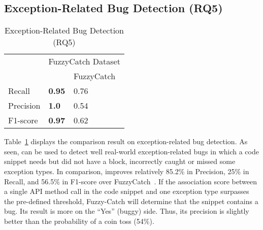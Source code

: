 \subsection{Exception-Related Bug Detection (RQ5)}
\label{sec:rq1}

\begin{table}[htpb]
  \caption {Exception-Related Bug Detection (RQ5)}
  \vspace{-12pt}
  \small
	\begin{center}
		\renewcommand{\arraystretch}{1}
		\begin{tabular}{|p{1.75cm}<{\centering}|p{1.75cm}<{\centering}|p{1.75cm}<{\centering}|}
		  \hline
			\multirow{2}{*}{} & \multicolumn{2}{c|}{FuzzyCatch Dataset} \\
			\cline{2-3}
			  & \tool  & FuzzyCatch~\cite{xrank-fse20} \\
			\hline
			Recall    & \textbf{0.95}& 0.76\\
			Precision & \textbf{1.0} & 0.54\\
			F1-score   & \textbf{0.97} & 0.62\\
			\hline
		\end{tabular}
		\label{tab:bug}
	\end{center}
\end{table}


Table~\ref{tab:bug} displays the comparison result on
exception-related bug detection. As seen, {\tool} can be used to
detect well real-world exception-related bugs in which a code snippet
needs but did not have a  block, incorrectly caught or
missed some exception types. In comparison, {\tool} improves
relatively 85.2\% in Precision, 25\% in Recall, and 56.5\% in F1-score
over FuzzyCatch~\cite{xrank-fse20}.
%
If the association score between a single API method call in the code
snippet and one exception type surpasses the pre-defined threshold, Fuzzy-Catch
will determine that the snippet contains a bug.
Its result is more on the ``Yes'' (buggy) side. Thus, its precision is
slightly better than the probability of a coin
toss (54\%).

